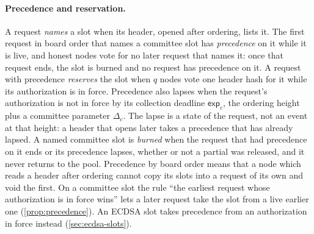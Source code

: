 \paragraph{Precedence and reservation.} A request \emph{names} a slot when its header, opened after ordering, lists it. The first request in board order that names a committee slot has \emph{precedence} on it while it is live, and honest nodes vote for no later request that names it: once that request ends, the slot is burned and no request has precedence on it. A request with precedence \emph{reserves} the slot when $q$ nodes vote one header hash for it while its authorization is in force. Precedence also lapses when the request's authorization is not in force by its collection deadline $\mathsf{exp}_c$, the ordering height plus a committee parameter $\Delta_c$. The lapse is a state of the request, not an event at that height: a header that opens later takes a precedence that has already lapsed. A named committee slot is \emph{burned} when the request that had precedence on it ends or its precedence lapses, whether or not a partial was released, and it never returns to the pool. Precedence by board order means that a node which reads a header after ordering cannot copy its slots into a request of its own and void the first. On a committee slot the rule ``the earliest request whose authorization is in force wins'' lets a later request take the slot from a live earlier one (\cref{prop:precedence}). An ECDSA slot takes precedence from an authorization in force instead (\cref{sec:ecdsa-slots}).

